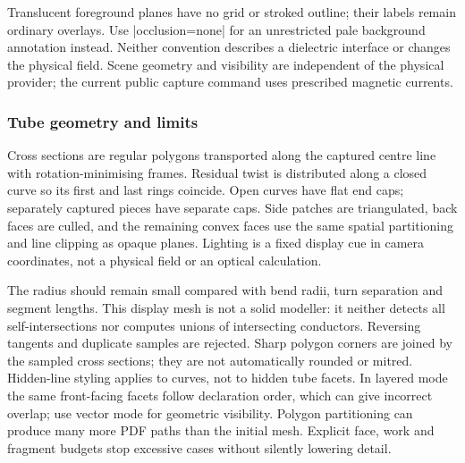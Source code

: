 Translucent foreground planes have no grid or stroked outline; their labels
remain ordinary overlays. Use |occlusion=none| for an unrestricted pale
background annotation instead. Neither convention describes a dielectric
interface or changes the physical field. Scene geometry and visibility are
independent of the physical provider; the current public capture command uses
prescribed magnetic currents.

\subsubsection{Tube geometry and limits}
Cross sections are regular polygons transported along the captured centre line
with rotation-minimising frames. Residual twist is distributed along a closed
curve so its first and last rings coincide. Open curves have flat end caps;
separately captured pieces have separate caps. Side patches are triangulated,
back faces are culled, and the remaining convex faces use the same spatial
partitioning and line clipping as opaque planes. Lighting is a fixed display
cue in camera coordinates, not a physical field or an optical calculation.

The radius should remain small compared with bend radii, turn separation and
segment lengths. This display mesh is not a solid modeller: it neither detects
all self-intersections nor computes unions of intersecting conductors. Reversing
tangents and duplicate samples are rejected. Sharp polygon corners are joined
by the sampled cross sections; they are not automatically rounded or mitred.
Hidden-line styling applies to curves, not to hidden tube facets. In layered
mode the same front-facing facets follow declaration order, which can give
incorrect overlap; use vector mode for geometric visibility. Polygon partitioning
can produce many more PDF paths than the initial mesh. Explicit face, work and
fragment budgets stop excessive cases without silently lowering detail.

